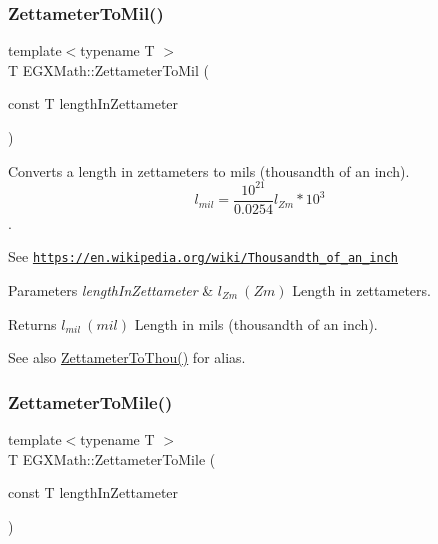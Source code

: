 \subsubsection{\texorpdfstring{Zettameter\+To\+Mil()}{ZettameterToMil()}}
{\footnotesize\ttfamily template$<$typename T $>$ \\
T E\+G\+X\+Math\+::\+Zettameter\+To\+Mil (\begin{DoxyParamCaption}\item[{const T}]{length\+In\+Zettameter }\end{DoxyParamCaption})}



Converts a length in zettameters to mils (thousandth of an inch). \[ l_{mil}= \frac{10^{21}}{0.0254} l_{Zm} * 10^{3} \]. 

See \href{https://en.wikipedia.org/wiki/Thousandth_of_an_inch}{\tt https\+://en.\+wikipedia.\+org/wiki/\+Thousandth\+\_\+of\+\_\+an\+\_\+inch} 
\begin{DoxyParams}{Parameters}
{\em length\+In\+Zettameter} & $ l_{Zm}\ (Zm)$ Length in zettameters. \\
\hline
\end{DoxyParams}
\begin{DoxyReturn}{Returns}
$ l_{mil}\ (mil)$ Length in mils (thousandth of an inch). 
\end{DoxyReturn}
\begin{DoxySeeAlso}{See also}
\mbox{\hyperlink{group___e_g_x_math-_conversions-_length_conversions-_zettameter-_imperial_gacd92ac6ab3300ca582966510e369a381}{Zettameter\+To\+Thou()}} for alias. 
\end{DoxySeeAlso}
\mbox{\label{group___e_g_x_math-_conversions-_length_conversions-_zettameter-_imperial_ga217b12dd9c920150cbcf50413e98dd47}} 
\subsubsection{\texorpdfstring{Zettameter\+To\+Mile()}{ZettameterToMile()}}
{\footnotesize\ttfamily template$<$typename T $>$ \\
T E\+G\+X\+Math\+::\+Zettameter\+To\+Mile (\begin{DoxyParamCaption}\item[{const T}]{length\+In\+Zettameter }\end{DoxyParamCaption})}



